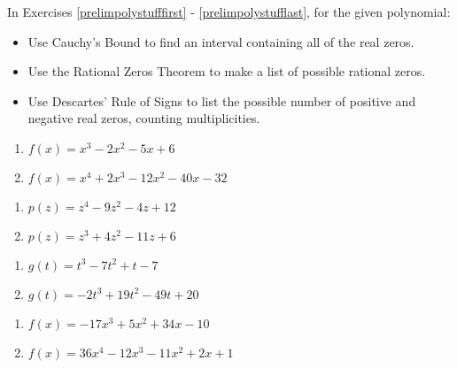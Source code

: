 In Exercises \ref{prelimpolystufffirst} - \ref{prelimpolystufflast}, for the given polynomial:

\begin{itemize}
\item  Use Cauchy's Bound to find an interval containing all of the real zeros.
\item  Use the Rational Zeros Theorem to make a list of possible rational zeros.
\item  Use Descartes' Rule of Signs to list the possible number of positive and negative real zeros, counting multiplicities.
\end{itemize}


\begin{multicols}{2}
\begin{enumerate}

\item $f(x) = x^{3} - 2x^{2} - 5x + 6$ \label{prelimpolystufffirst}
\item $f(x) = x^{4} + 2x^{3} - 12x^{2} - 40x - 32$

\setcounter{HW}{\value{enumi}}
\end{enumerate}
\end{multicols}

\begin{multicols}{2}
\begin{enumerate}
\setcounter{enumi}{\value{HW}}

\item $p(z) = z^{4} - 9z^{2} - 4z + 12$
\item $p(z) = z^{3} + 4z^{2} - 11z + 6$

\setcounter{HW}{\value{enumi}}
\end{enumerate}
\end{multicols}

\begin{multicols}{2}
\begin{enumerate}
\setcounter{enumi}{\value{HW}}

\item $g(t) = t^{3} - 7t^{2} + t - 7$
\item $g(t) = -2t^{3} + 19t^{2} - 49t + 20$

\setcounter{HW}{\value{enumi}}
\end{enumerate}
\end{multicols}

\begin{multicols}{2}
\begin{enumerate}
\setcounter{enumi}{\value{HW}}

\item $f(x) = -17x^{3} + 5x^{2} + 34x - 10$
\item $f(x) = 36x^{4} - 12x^{3} - 11x^{2} + 2x + 1$

\setcounter{HW}{\value{enumi}}
\end{enumerate}
\end{multicols}

